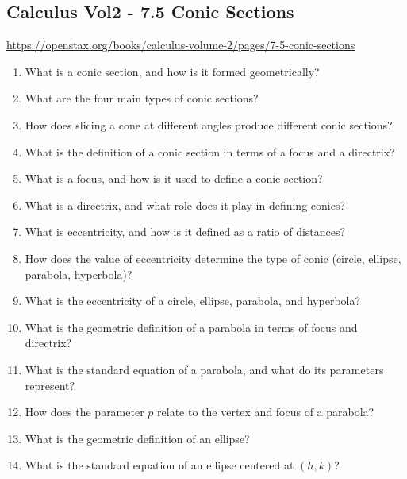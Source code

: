 \subsection{Calculus Vol2 - 7.5 Conic Sections}

\url{https://openstax.org/books/calculus-volume-2/pages/7-5-conic-sections}

\begin{enumerate}

\item What is a conic section, and how is it formed geometrically?

\item What are the four main types of conic sections?

\item How does slicing a cone at different angles produce different conic sections?

\item What is the definition of a conic section in terms of a focus and a directrix?

\item What is a focus, and how is it used to define a conic section?

\item What is a directrix, and what role does it play in defining conics?

\item What is eccentricity, and how is it defined as a ratio of distances?

\item How does the value of eccentricity determine the type of conic (circle, ellipse, parabola, hyperbola)?

\item What is the eccentricity of a circle, ellipse, parabola, and hyperbola?

\item What is the geometric definition of a parabola in terms of focus and directrix?

\item What is the standard equation of a parabola, and what do its parameters represent?

\item How does the parameter $p$ relate to the vertex and focus of a parabola?

\item What is the geometric definition of an ellipse?

\item What is the standard equation of an ellipse centered at $(h,k)$?


\end{enumerate}
